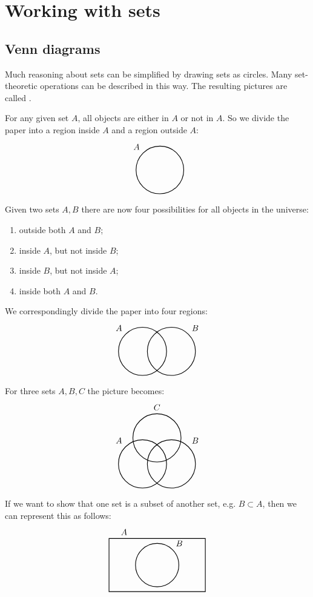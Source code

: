 \section{Working with sets}
\subsection{Venn diagrams}
Much reasoning about sets can be simplified by drawing sets as circles. Many set-theoretic operations can be described in this way. The resulting pictures are called .

For any given set $A$, all objects are either in $A$ or not in $A$. So we divide the paper into a region inside $A$ and a region outside $A$:
\[\begin{tikzpicture}[thick]
\node[draw,
    circle,
    minimum size =2cm,
    label=135:$A$] (circle1) at (0,0){};
\end{tikzpicture} \]

Given two sets $A,B$ there are now four possibilities for all objects in the universe:
\begin{enumerate}
\item outside both $A$ and $B$;
\item inside $A$, but not inside $B$;
\item inside $B$, but not inside $A$;
\item inside both $A$ and $B$.
\end{enumerate}
We correspondingly divide the paper into four regions:
\[ \begin{tikzpicture}[thick]
\node [draw,
    circle,
    minimum size =2cm,
    label={135:$A$}] (A) at (0,0){};
\node [draw,
    circle,
    minimum size =2cm,
    label={45:$B$}] (B) at (1.2,0){};
\end{tikzpicture} \]

For three sets $A,B,C$ the picture becomes:
\[ \begin{tikzpicture}[thick]
\node[draw,circle,minimum size =2cm,label={135:$A$}] (A) at (0,0) {};

\node[draw,circle,minimum size =2cm,label={45:$B$}] (B) at (1.2,0) {};

\node[draw,circle,minimum size =2cm,label=$C$] (C) at (0.6,1.08) {};
\end{tikzpicture} \]

If we want to show that one set is a subset of another set, e.g. $B\subset A$, then we can represent this as follows:
\[ \begin{tikzpicture}[thick]
\node [draw,
    rectangle,
    minimum width =4cm,
	minimum height = 2.2cm,
    label={135:$A$}] (A) at (0,0){};
\node [draw,
    circle,
    minimum size =1.8cm,
    label={45:$B$}] (B) at (0,0){};
\end{tikzpicture} \]


